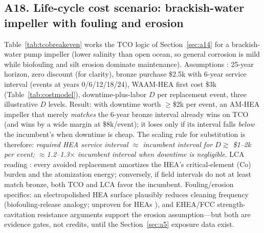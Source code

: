 \subsection{A18. Life-cycle cost scenario: brackish-water impeller with fouling and erosion}
\label{sec:a18}

Table~\ref{tab:tcobreakeven} works the TCO logic of Section~\ref{sec:a14} for a brackish-water pump impeller (lower salinity than open ocean, so general corrosion is mild while biofouling and silt erosion dominate maintenance). Assumptions \prop{}: 25-year horizon, zero discount (for clarity), bronze purchase \$2.5k with 6-year service interval (events at years 0/6/12/18/24), WAAM-HEA first cost \$3k (Table~\ref{tab:costmodel}), downtime-plus-labor $D$ per replacement event, three illustrative $D$ levels. Result: with downtime worth $\geq$\$2k per event, an AM-HEA impeller that merely \emph{matches} the 6-year bronze interval already wins on TCO (and wins by a wide margin at \$8k/event); it loses only if its interval falls \emph{below} the incumbent's when downtime is cheap. The scaling rule for substitution is therefore: \emph{required HEA service interval $\approx$ incumbent interval for $D \gtrsim$ \$1--2k per event; $\approx$1.2--1.3$\times$ incumbent interval when downtime is negligible}. LCA reading \prop{}: every avoided replacement amortizes the HEA's critical-element (Co) burden and the atomization energy; conversely, if field intervals do not at least match bronze, both TCO and LCA favor the incumbent. Fouling/erosion specifics: an electropolished HEA surface plausibly reduces cleaning frequency (biofouling-release analogy; unproven for HEAs \cite{nass2025marine}), and EHEA/FCC strength-cavitation resistance arguments support the erosion assumption---but both are evidence gates, not credits, until the Section~\ref{sec:a5} exposure data exist.









